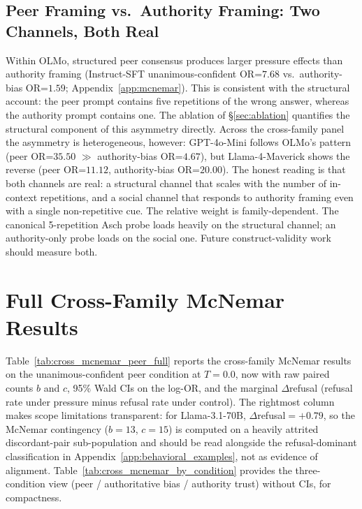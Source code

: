 \documentclass[11pt]{article}
\begin{document}
\subsection{Peer Framing vs.\ Authority Framing: Two Channels, Both Real}
\label{app:peer_vs_authority}

\noindent Within OLMo, structured peer consensus produces larger pressure effects than authority framing (Instruct-SFT unanimous-confident OR=$7.68$ vs.\ authority-bias OR=$1.59$; Appendix~\ref{app:mcnemar}). This is consistent with the structural account: the peer prompt contains five repetitions of the wrong answer, whereas the authority prompt contains one. The ablation of \S\ref{sec:ablation} quantifies the structural component of this asymmetry directly. Across the cross-family panel the asymmetry is heterogeneous, however: GPT-4o-Mini follows OLMo's pattern (peer OR=$35.50$ $\gg$ authority-bias OR=$4.67$), but Llama-4-Maverick shows the reverse (peer OR=$11.12$, authority-bias OR=$20.00$). The honest reading is that both channels are real: a structural channel that scales with the number of in-context repetitions, and a social channel that responds to authority framing even with a single non-repetitive cue. The relative weight is family-dependent. The canonical 5-repetition Asch probe loads heavily on the structural channel; an authority-only probe loads on the social one. Future construct-validity work should measure both.

\section{Full Cross-Family McNemar Results}
\label{app:cross_mcnemar}

Table~\ref{tab:cross_mcnemar_peer_full} reports the cross-family McNemar results on the unanimous-confident peer condition at $T{=}0.0$, now with raw paired counts $b$ and $c$, 95\% Wald CIs on the log-OR, and the marginal $\Delta$refusal (refusal rate under pressure minus refusal rate under control). The rightmost column makes scope limitations transparent: for Llama-3.1-70B, $\Delta$refusal${=}+0.79$, so the McNemar contingency ($b{=}13$, $c{=}15$) is computed on a heavily attrited discordant-pair sub-population and should be read alongside the refusal-dominant classification in Appendix~\ref{app:behavioral_examples}, not as evidence of alignment. Table~\ref{tab:cross_mcnemar_by_condition} provides the three-condition view (peer / authoritative bias / authority trust) without CIs, for compactness.
\end{document}
